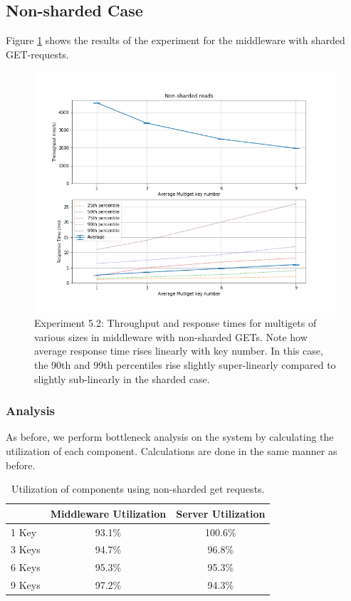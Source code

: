 \documentclass[11pt,a4paper]{article}
\begin{document}
\subsection{Non-sharded Case}

Figure \ref{fig:52_all_req} shows the results of the experiment for the middleware with sharded GET-requests.

\begin{figure}
\centering
\includegraphics[width=.9\textwidth]{52/52_all_requests.png}
\caption{Experiment 5.2: Throughput and response times for multigets of various sizes in middleware with non-sharded GETs. Note how average response time rises linearly with key number. In this case, the 90th and 99th percentiles rise slightly super-linearly compared to slightly sub-linearly in the sharded case.}
\label{fig:52_all_req}
\end{figure}

\subsubsection{Analysis}
As before, we perform bottleneck analysis on the system by calculating the utilization of each component. Calculations are done in the same manner as before.

\begin{table}[h]
\centering
\caption{Utilization of components using non-sharded get requests.}
\label{table:52_util}
\begin{tabular}{l|cc}
       & \multicolumn{1}{l}{Middleware Utilization} & \multicolumn{1}{l}{Server Utilization} \\ \hline
1 Key  & 93.1\%                                     & 100.6\%                                \\
3 Keys & 94.7\%                                     & 96.8\%                                 \\
6 Keys & 95.3\%                                     & 95.3\%                                 \\
9 Keys & 97.2\%                                     & 94.3\%                                
\end{tabular}
\end{table}
\end{document}
